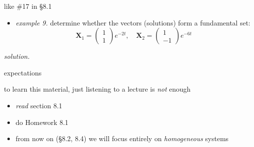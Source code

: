 \documentclass[dvipsnames,colorlinks]{beamer}
\newcommand{\bX}{\mathbf{X}}
\begin{document}
\begin{frame}{like \#17 in \S8.1}

\begin{itemize}
\item \emph{example 9.}  determine whether the vectors (solutions) form a fundamental set:
    $$\bX_1 = \begin{pmatrix} 1 \\ 1 \end{pmatrix} e^{-2t}, \quad \bX_2 = \begin{pmatrix} 1 \\ -1 \end{pmatrix} e^{-6t}$$
\end{itemize}

\noindent \emph{solution.}

\vspace{40mm}
\end{frame}


\begin{frame}{expectations}

to learn this material, just listening to a lecture is \emph{not} enough
     \begin{itemize}
     \item \emph{read} section 8.1
     \item do Homework 8.1
     \item from now on (\S 8.2, 8.4) we will focus entirely on \emph{homogeneous} systems
     \end{itemize}
\end{frame}
\end{document}
